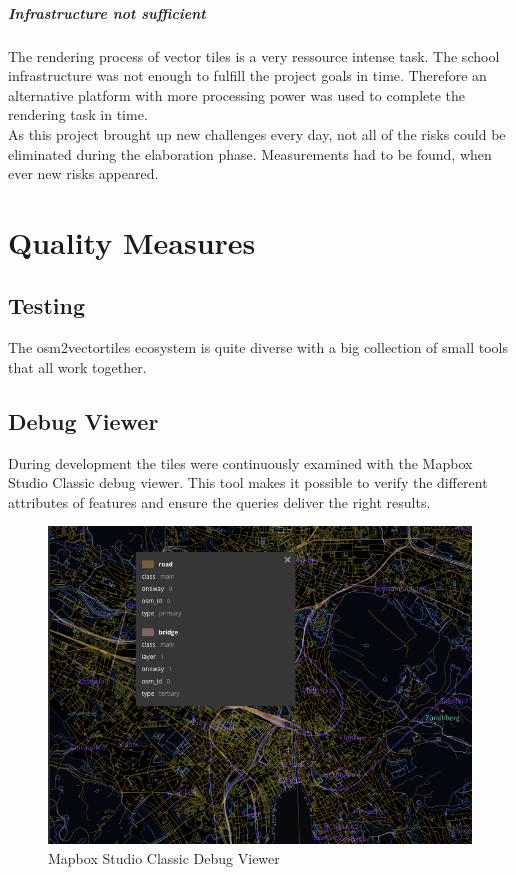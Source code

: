 \paragraph{Infrastructure not sufficient} The rendering process of vector tiles is a very ressource intense task. The school infrastructure was not enough to fulfill the project goals in time. Therefore an alternative platform with more processing power was used to complete the rendering task in time.\\

As this project brought up new challenges every day, not all of the risks could be eliminated during the elaboration phase. Measurements had to be found, when ever new risks appeared.

\newpage
\chapter{Quality Measures}\label{quality-measures}

\section{Testing}\label{testing}

The osm2vectortiles ecosystem is quite diverse with a big collection of small tools that all work together.

\section{Debug Viewer}

During development the tiles were continuously examined with the Mapbox Studio Classic debug viewer.
This tool makes it possible to verify the different attributes of features and ensure the queries deliver the right results.

\begin{figure}[H]
  \includegraphics[width=1\textwidth]{images/mapbox_studio_debug_viewer.png}
  \caption{Mapbox Studio Classic Debug Viewer}
\end{figure}

